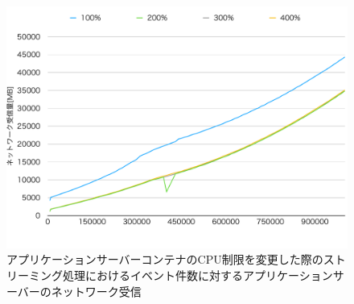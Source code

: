 \documentclass[../../../../../main]{subfiles}
\begin{document}
    \begin{figure}[H]
        \centering
        \includegraphics[width=12cm]{graph}
        \caption{アプリケーションサーバーコンテナのCPU制限を変更した際のストリーミング処理におけるイベント件数に対するアプリケーションサーバーのネットワーク受信}
        \label{fig:stream-change-app-cpu-limit-app-net-in-app_1024-db_1_1024}
    \end{figure}
\end{document}
